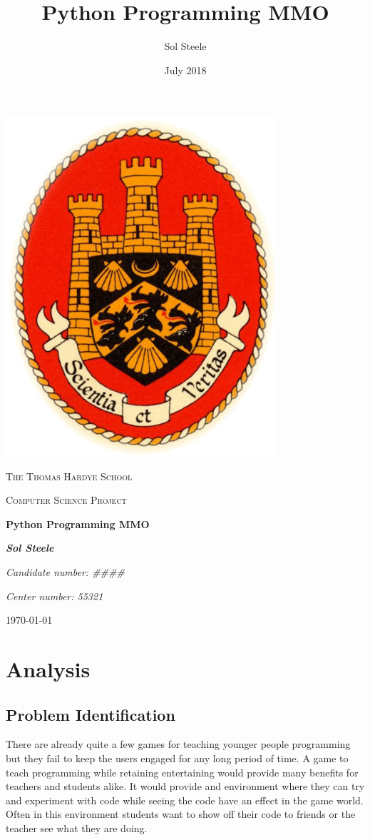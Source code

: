 \documentclass[12pt]{article}
\title{Python Programming MMO}
\author{Sol Steele}
\date{July 2018}
\begin{document}
\begin{titlepage}
    \centering
    \begin{center}
        \includegraphics[width=10cm]{ThsLogo.png}
    \end{center}
    {\scshape\LARGE The Thomas Hardye School\par}
{\scshape\Large Computer Science Project\par}
\vspace{1.5cm}
{\huge\bfseries Python Programming MMO\par}
\vspace{0.5cm}
{\Large\itshape \textbf{Sol Steele}\par}
{\Large\itshape Candidate number: \#\#\#\#\par}
{\Large\itshape Center number: 55321\par}
\vfill
{\large \today\par}
\end{titlepage}

\tableofcontents
\newpage

\section{Analysis}
\subsection{Problem Identification}
There are already quite a few games for teaching younger people programming but they fail to keep the users engaged for any long period of time. A game to teach programming while retaining entertaining would provide many benefits for teachers and students alike. It would provide and environment where they can try and experiment with code while seeing the code have an effect in the game world. Often in this environment students want to show off their code to friends or the teacher see what they are doing.
\end{document}
